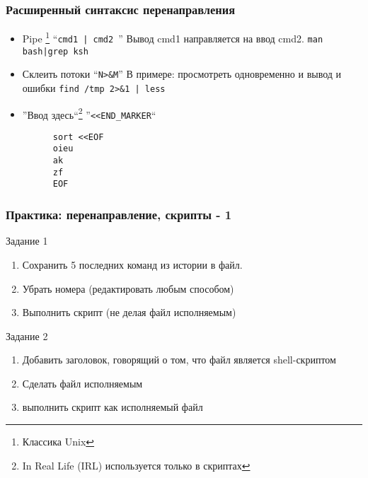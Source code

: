 \begin{frame}[fragile]
  \frametitle{Расширенный синтаксис перенаправления}
  
  \begin{itemize}
    \item \alert{Pipe} \footnote{Классика Unix} ``\verb+cmd1 | cmd2 +'' \newline
      Вывод cmd1 направляется на ввод cmd2. \newline
      \verb+man bash|grep ksh+ \pause
    \item \alert{Склеить потоки}  ``\verb+N>&M+'' \newline
      В примере: просмотреть одновременно и вывод и ошибки \newline
      \verb+find /tmp 2>&1 | less+ \pause
    \item \alert{''Ввод здесь``}\footnote{In Real Life (IRL) используется только в скриптах} ''\verb+<<END_MARKER+`` \newline
      \begin{verbatim}
      sort <<EOF
      oieu
      ak
      zf
      EOF
      \end{verbatim}
  \end{itemize}
\end{frame}

\begin{frame}
  \frametitle{Практика: перенаправление, скрипты - 1} 

  \alert{Задание 1}
  \begin{enumerate}
    \item Сохранить 5 последних команд из истории в файл.
    \item Убрать номера (редактировать любым способом)
    \item Выполнить скрипт (не делая файл исполняемым)
  \end{enumerate}
  \pause

  \alert{Задание 2}
  \begin{enumerate}
    \item Добавить заголовок, говорящий о том, что файл является shell-скриптом
    \item Сделать файл исполняемым
    \item выполнить скрипт как исполняемый файл
  \end{enumerate}
\end{frame}

